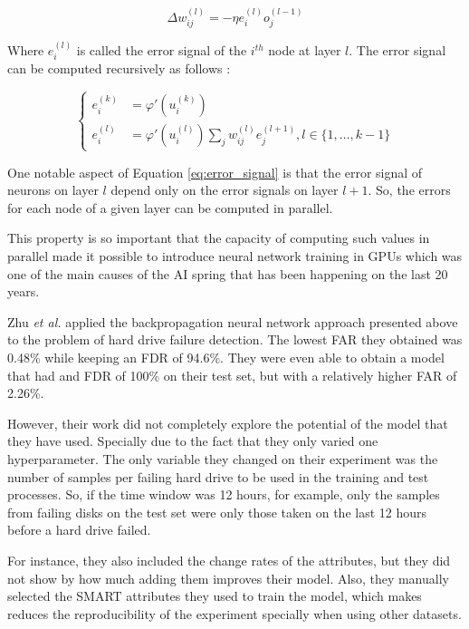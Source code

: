 \begin{equation}
\Delta w_{ij}^{(l)} = -\eta e_i^{(l)} o_{j}^{(l-1)}
\end{equation}

Where $e_i^{(l)}$ is called the error signal of the $i^{th}$ node at layer $l$.
The error signal can be computed recursively as follows \cite{amari1993backpropagation}:

\begin{equation}\label{eq:error_signal}
\begin{cases}
    e_i^{(k)} &= \varphi '(u_i^{(k)}) \\
    e_i^{(l)} &= \varphi '(u_i^{(l)}) \sum_j w_{ij}^{(l)}e_j^{(l+1)}, l \in \{1,\dots,k-1\}
\end{cases}
\end{equation}

One notable aspect of Equation \ref{eq:error_signal} is that the error signal of neurons on layer $l$ depend only on the error signals on layer $l+1$.
So, the errors for each node of a given layer can be computed in parallel.

This property is so important that the capacity of computing such values in parallel made it possible to introduce neural network training in GPUs \cite{steinkraus2005using} which was one of the main causes of the AI spring that has been happening on the last 20 years.

Zhu \textit{et al.} \cite{Zhu13} applied the backpropagation neural network approach presented above to the problem of hard drive failure detection.
The lowest FAR they obtained was 0.48\% while keeping an FDR of 94.6\%.
They were even able to obtain a model that had and FDR of 100\% on their test set, but with a relatively higher FAR of 2.26\%.

However, their work did not completely explore the potential of the model that they have used.
Specially due to the fact that they only varied one hyperparameter.
The only variable they changed on their experiment was the number of samples per failing hard drive to be used in the training and test processes.
So, if the time window was 12 hours, for example, only the samples from failing disks on the test set were only those taken on the last 12 hours before a hard drive failed.

For instance, they also included the change rates of the attributes, but they did not show by how much adding them improves their model.
Also, they manually selected the SMART attributes they used to train the model, which makes reduces the reproducibility of the experiment specially when using other datasets.

